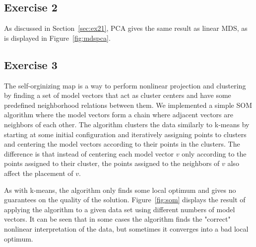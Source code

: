 \documentclass{article}
\begin{document}
\subsection{Exercise 2}
As discussed in Section~\ref{sec:ex21}, PCA gives the same result as linear MDS, as is displayed in Figure~\ref{fig:mdspca}.

\subsection{Exercise 3}
The self-orginizing map is a way to perform nonlinear projection and clustering by finding a set of model vectors that act as cluster centers and have some predefined neighborhood relations between them.
We implemented a simple SOM algorithm where the model vectors form a chain where adjacent vectors are neighbors of each other.
The algorithm clusters the data similarly to k-means by starting at some initial configuration and iteratively assigning points to clusters and centering the model vectors according to their points in the clusters.
The difference is that instead of centering each model vector $v$ only according to the points assigned to their cluster, the points assigned to the neighbors of $v$ also affect the placement of $v$.

As with k-means, the algorithm only finds some local optimum and gives no guarantees on the quality of the solution.
Figure~\ref{fig:som} displays the result of applying the algorithm to a given data set using different numbers of model vectors.
It can be seen that in some cases the algorithm finds the "correct" nonlinear interpretation of the data, but sometimes it converges into a bad local optimum.
\end{document}

